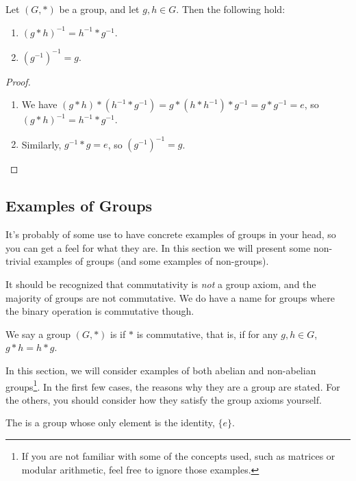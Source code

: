 \documentclass[a4]{scrreprt}
\newcommand{\newsubsection}{\subsection}
\begin{document}
\begin{proposition}
	Let $(G, *)$ be a group, and let $g, h \in G$. Then the following hold:
	\begin{enumerate}[label=(\roman*)]
		\item $(g*h)^{-1} = h^{-1} * g^{-1}$.
		\item $(g^{-1})^{-1} = g$.
	\end{enumerate}
\end{proposition}
\begin{proof}$ $\phantom{\qedhere}
	\begin{enumerate}[label=(\roman*)]
		\item We have $(g*h) * (h^{-1} * g^{-1}) =  g * (h * h^{-1}) * g^{-1} = g * g^{-1} = e$, so $(g*h)^{-1} = h^{-1} * g^{-1}$.
		\item Similarly, $g^{-1} * g = e$, so $(g^{-1})^{-1} = g$. \hfill \qedsymbol
	\end{enumerate}
\end{proof}

\newsubsection{Examples of Groups}

It's probably of some use to have concrete examples of groups in your head, so you can get a feel for what they are. In this section we will present some non-trivial examples of groups (and some examples of non-groups).

It should be recognized that commutativity is \emph{not} a group axiom, and the majority of groups are not commutative. We do have a name for groups where the binary operation is commutative though.

\begin{definition}
	We say a group $(G, *)$ is  if $*$ is commutative, that is, if for any $g, h \in G$, $g * h = h * g$.
\end{definition}

In this section, we will consider examples of both abelian and non-abelian groups\footnote{If you are not familiar with some of the concepts used, such as matrices or modular arithmetic, feel free to ignore those examples.}. In the first few cases, the reasons why they are a group are stated. For the others, you should consider how they satisfy the group axioms yourself. 

\begin{example}
	The  is a group whose only element is the identity, $\{ e \}$.
\end{example}
\end{document}
